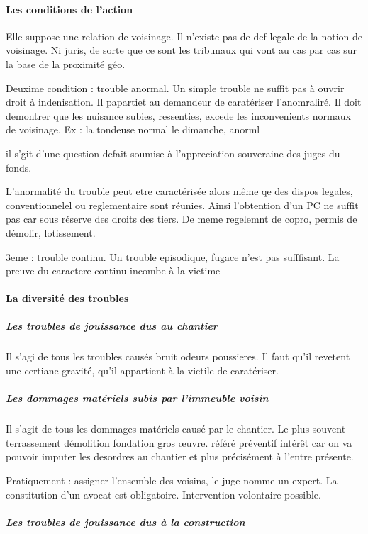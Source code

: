 			\paragraph{Les conditions de l'action}

				Elle suppose une relation de voisinage. Il n'existe pas de def legale de la notion de voisinage. Ni juris, de sorte que ce sont les tribunaux qui vont au cas par cas sur la base de la proximité géo.

				Deuxime condition : trouble anormal. Un simple trouble ne suffit pas à ouvrir droit à indenisation. Il papartiet au demandeur de caratériser l'anomraliré. Il doit demontrer que les nuisance subies, ressenties, excede les inconvenients normaux de voisinage. Ex : la tondeuse normal le dimanche, anorml

				il s'git d'une question defait soumise à l'appreciation souveraine des juges du fonds.

				L'anormalité du trouble peut etre caractérisée alors même qe des dispos legales, conventionnelel ou reglementaire sont réunies. Ainsi l'obtention d'un PC ne suffit pas car sous réserve des droits des tiers. De meme regelemnt de copro, permis de démolir, lotissement.

				3eme : trouble continu. Un trouble episodique, fugace n'est pas sufffisant. La preuve du caractere continu incombe à la victime

			\paragraph{La diversité des troubles}

				\subparagraph{Les troubles de jouissance dus au chantier}

					Il s'agi de tous les troubles causés bruit odeurs poussieres. Il faut qu'il revetent une certiane gravité, qu'il appartient à la victile de caratériser.

				\subparagraph{Les dommages matériels subis par l'immeuble voisin}

					Il s'agit de tous les dommages matériels causé par le chantier. Le plus souvent terrassement démolition fondation gros œuvre. référé préventif intérêt car on va pouvoir imputer les desordres au chantier et plus précisément à l'entre présente.

					Pratiquement : assigner l'ensemble des voisins, le juge nomme un expert. La constitution d'un avocat est obligatoire. Intervention volontaire possible.

				\subparagraph{Les troubles de jouissance dus à la construction}

